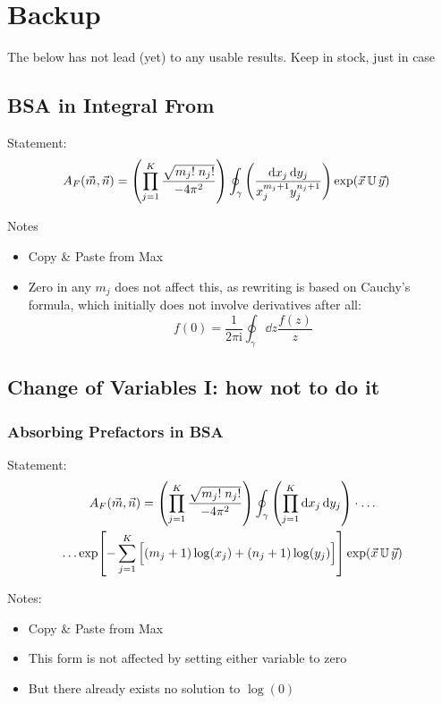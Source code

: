 \documentclass[
	english,
	a4paper,
	fontsize=10pt,
	parskip=half,
	titlepage=true,
	DIV=12,
	final
]{scrreprt}
\newcommand*{\iunit}{\ensuremath{\mathrm{i}}}
\begin{document}
\chapter{Backup}
The below has not lead (yet) to any usable results. Keep in stock, just in case
\section{BSA in Integral From}
Statement:
\begin{align}
	A_F(\vec{m}, \vec{n})
&=
	\qty(
		\prod_{j=1}^{K}
		\frac
			{\sqrt{m_j! \; n_j!}}
			{-4\pi^{2}}
	)
	\oint_{\gamma}
		\qty(
			\frac
			{\dd{x_j} \dd{y_j}}
			{x_j^{m_j+1}  y_j^{n_j+1}}
		)
		\exp(\vec{x} \, \mathbb{U} \, \vec{y})
	\label{eqn:BSA_Int}
\end{align}

Notes
\begin{itemize}
\item Copy \& Paste from Max
\item Zero in any $m_j$ does not affect this, as rewriting is based on Cauchy's formula, which initially
	does not involve derivatives after all:
	\begin{equation}
		f(0)
	=
		\frac{1}{2\pi \iunit}
		\oint_{\gamma} \dd{z}
			\frac{f(z)}{z}
	\end{equation}
\end{itemize}

\section{Change of Variables I: how not to do it}
\subsection{Absorbing Prefactors in BSA}
Statement:
\begin{multline}
	A_F(\vec{m}, \vec{n})
=
	\qty(
		\prod_{j=1}^{K}
		\frac
			{\sqrt{m_j! \; n_j!}}
			{-4\pi^{2}}
	)
	\oint_{\gamma}
		\qty(
			\prod_{j=1}^{K}
			\dd{x_j} \dd{y_j}
		)  \cdot \ldots
\\
		\ldots \exp[
			-\sum_{j=1}^{K} 
			\qty[ \Big.
				(m_j + 1) \log(x_j) +
				(n_j + 1) \log(y_j)
			]
		]
		\exp(\vec{x} \, \mathbb{U} \, \vec{y})
	\label{eqn:BSA_IntAbsorbed}
\end{multline}

Notes:
\begin{itemize}
\item Copy \& Paste from Max
\item This form is not affected by setting either variable to zero
\item But there already exists no solution to $\log(0)$
\end{itemize}
\end{document}
